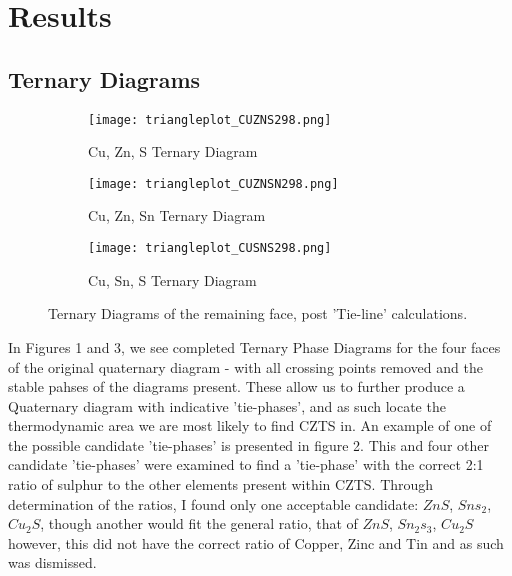
\chapter{Results} %

\label{Chapter3} %



\section{Ternary Diagrams}

\begin{figure}
\centering
\begin{subfigure}{80mm}
  \centering
    \texttt{[image: triangleplot\_CUZNS298.png]}
    \caption{Cu, Zn, S Ternary Diagram}
    \label{fig:CuZnS}
\end{subfigure}%
\begin{subfigure}{80mm}
 \centering
    \texttt{[image: triangleplot\_CUZNSN298.png]}
    \caption{Cu, Zn, Sn Ternary Diagram}
    \label{fig:CuZnSn}
\end{subfigure}
\begin{subfigure}{80mm}
 \centering
    \texttt{[image: triangleplot\_CUSNS298.png]}
    \caption{Cu, Sn, S Ternary Diagram}
    \label{fig:CuSnS}
\end{subfigure}
\caption{Ternary Diagrams of the remaining face, post 'Tie-line' calculations.}
\label{fig:RemainingFaces}
\end{figure}

In Figures 1 and 3, we see completed Ternary Phase Diagrams for the four faces of the original quaternary diagram - with all crossing points removed and the stable pahses of the diagrams present.
These allow us to further produce a Quaternary diagram with indicative 'tie-phases', and as such locate the thermodynamic area we are most likely to find CZTS in. An example of one of the possible candidate 'tie-phases' is presented in figure 2. This and four other candidate 'tie-phases' were examined to find a 'tie-phase' with the correct 2:1 ratio of sulphur to the other elements present within CZTS. Through determination of the ratios, I found only one acceptable candidate: $ZnS$, $Sns_2$, $Cu_2S$, though another would fit the general ratio, that of $ZnS$, $Sn_2s_3$, $Cu_2S$ however, this did not have the correct ratio of Copper, Zinc and Tin and as such was dismissed.

